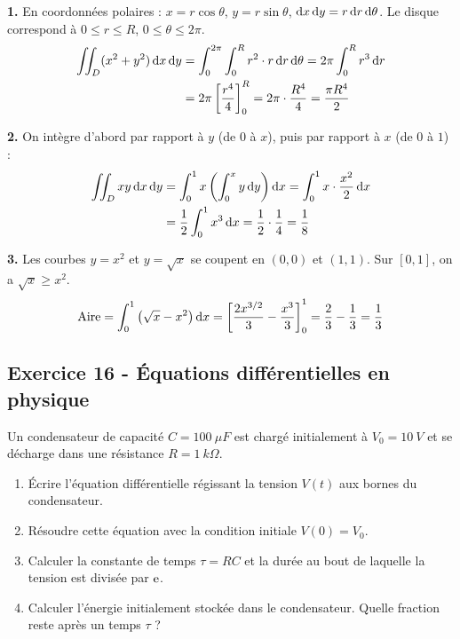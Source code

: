 \documentclass[12pt,a4paper]{article}
\begin{document}
\begin{boitecorrige}
\textbf{1.} En coordonnées polaires : $x = r\cos\theta$, $y = r\sin\theta$, $\mathrm{d} x\,\mathrm{d} y = r\,\mathrm{d} r\,\mathrm{d}\theta$. Le disque correspond à $0 \leq r \leq R$, $0 \leq \theta \leq 2\pi$.
\begin{align*}
\iint_D (x^2+y^2)\,\mathrm{d} x\,\mathrm{d} y &= \int_0^{2\pi}\int_0^R r^2 \cdot r\,\mathrm{d} r\,\mathrm{d}\theta = 2\pi\int_0^R r^3\,\mathrm{d} r \\
&= 2\pi\left[\frac{r^4}{4}\right]_0^R = 2\pi\cdot\frac{R^4}{4} = \frac{\pi R^4}{2}
\end{align*}

\textbf{2.} On intègre d'abord par rapport à $y$ (de $0$ à $x$), puis par rapport à $x$ (de $0$ à $1$) :
\begin{align*}
\iint_D xy\,\mathrm{d} x\,\mathrm{d} y &= \int_0^1 x\left(\int_0^x y\,\mathrm{d} y\right)\mathrm{d} x = \int_0^1 x\cdot\frac{x^2}{2}\,\mathrm{d} x \\
&= \frac{1}{2}\int_0^1 x^3\,\mathrm{d} x = \frac{1}{2}\cdot\frac{1}{4} = \frac{1}{8}
\end{align*}

\textbf{3.} Les courbes $y = x^2$ et $y = \sqrt{x}$ se coupent en $(0,0)$ et $(1,1)$. Sur $[0,1]$, on a $\sqrt{x} \geq x^2$.
\[
\text{Aire} = \int_0^1 \left(\sqrt{x} - x^2\right)\mathrm{d} x = \left[\frac{2x^{3/2}}{3} - \frac{x^3}{3}\right]_0^1 = \frac{2}{3} - \frac{1}{3} = \frac{1}{3}
\]
\end{boitecorrige}

\subsection*{Exercice 16 - Équations différentielles en physique \niveau{\moyen}}

\begin{boiteexercice}
Un condensateur de capacité $C = \qty{100}{\mu F}$ est chargé initialement à $V_0 = \qty{10}{V}$ et se décharge dans une résistance $R = \qty{1}{k\Omega}$.
\begin{enumerate}
  \item Écrire l'équation différentielle régissant la tension $V(t)$ aux bornes du condensateur.
  \item Résoudre cette équation avec la condition initiale $V(0) = V_0$.
  \item Calculer la constante de temps $\tau = RC$ et la durée au bout de laquelle la tension est divisée par $\mathrm{e}$.
  \item Calculer l'énergie initialement stockée dans le condensateur. Quelle fraction reste après un temps $\tau$ ?
\end{enumerate}
\end{boiteexercice}
\end{document}
